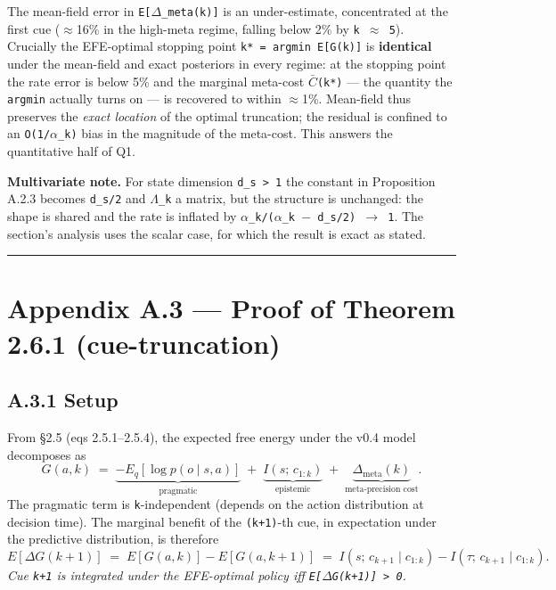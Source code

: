 \documentclass{article}
\begin{document}
The mean-field error in \texttt{E{[}\ensuremath{\Delta}\_meta(k){]}} is an under-estimate,
concentrated at the first cue (\ensuremath{\approx}16\% in the high-meta regime, falling
below 2\% by \texttt{k\ \ensuremath{\approx}\ 5}). Crucially the EFE-optimal stopping point
\texttt{k*\ =\ argmin\ E{[}G(k){]}} is \textbf{identical} under the
mean-field and exact posteriors in every regime: at the stopping point
the rate error is below 5\% and the marginal meta-cost \texttt{\ensuremath{\bar{C}}(k*)}
--- the quantity the \texttt{argmin} actually turns on --- is recovered
to within \ensuremath{\approx}1\%. Mean-field thus preserves the \emph{exact location} of
the optimal truncation; the residual is confined to an
\texttt{O(1/\ensuremath{\alpha}\_k)} bias in the magnitude of the meta-cost. This answers
the quantitative half of Q1.

\textbf{Multivariate note.} For state dimension
\texttt{d\_s\ \textgreater{}\ 1} the constant \texttt{\textonehalf{}} in Proposition
A.2.3 becomes \texttt{d\_s/2} and \texttt{\ensuremath{\Lambda}\_k} a matrix, but the
structure is unchanged: the shape is shared and the rate is inflated by
\texttt{\ensuremath{\alpha}\_k/(\ensuremath{\alpha}\_k\ \ensuremath{-}\ d\_s/2)\ \ensuremath{\rightarrow}\ 1}. The section's analysis uses the
scalar case, for which the result is exact as stated.

\begin{center}\rule{0.5\linewidth}{0.5pt}\end{center}

\section{Appendix A.3 --- Proof of Theorem 2.6.1
(cue-truncation)}\label{appendix-a.3-proof-of-theorem-2.6.1-cue-truncation}

\subsection{A.3.1 Setup}\label{a.3.1-setup}

From \S{}2.5 (eqs 2.5.1--2.5.4), the expected free energy under the v0.4
model decomposes as \[
G(a, k) \;=\; \underbrace{-E_q[\log p(o \mid s, a)]}_{\text{pragmatic}} \;+\; \underbrace{I(s;\, c_{1:k})}_{\text{epistemic}} \;+\; \underbrace{\Delta_{\mathrm{meta}}(k)}_{\text{meta-precision cost}}.
\] The pragmatic term is \texttt{k}-independent (depends on the action
distribution at decision time). The marginal benefit of the
\texttt{(k+1)}-th cue, in expectation under the predictive distribution,
is therefore \[
E[\Delta G(k+1)] \;=\; E[G(a, k)] - E[G(a, k+1)] \;=\; I(s;\, c_{k+1} \mid c_{1:k}) - I(\tau;\, c_{k+1} \mid c_{1:k}).
\] \emph{Cue \texttt{k+1} is integrated under the EFE-optimal policy iff
\texttt{E{[}\ensuremath{\Delta}G(k+1){]}\ \textgreater{}\ 0}.}
\end{document}
